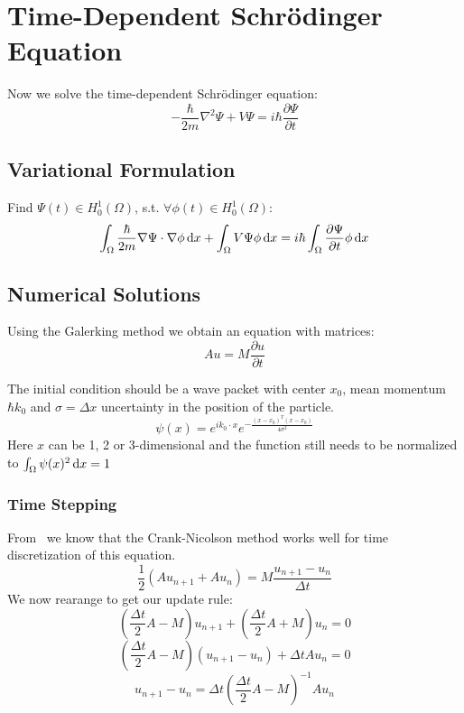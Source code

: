 \documentclass[a4paper,11pt]{scrartcl}
\newcommand*{\dx}{\dif{}x}
\newcommand*{\Dt}{\Delta{}t}
\begin{document}
\section{Time-Dependent Schrödinger Equation}
Now we solve the time-dependent Schrödinger equation:
\[ -\frac{\hbar}{2m} \nabla^2 \Psi + V \Psi = i \hbar \frac{\partial\Psi}{\partial{}t}\]

\subsection{Variational Formulation}

Find $\Psi(t) \in H^1_0(\Omega)$, s.t. $\forall \phi(t) \in H^1_0(\Omega)$:
\[ \int_{\Omega} \frac{\hbar}{2m} \nabla \Psi \cdot \nabla\phi \dx +
  \int_{\Omega} V \Psi \phi\dx = i \hbar\int_{\Omega}
  \frac{\partial\Psi}{\partial{}t} \phi\dx\]

\subsection{Numerical Solutions}
Using the Galerking method we obtain an equation with matrices:
\[A u = M \frac{\partial{}u}{\partial{}t}\]

The initial condition should be a wave packet with center $x_0$, mean momentum
$\hbar k_0$ and $\sigma = \Delta x$ uncertainty in the position of the particle.
\[\psi(x) =  e^{ik_0\cdot x}e^{-\frac{(x-x_0)^T(x-x_0)}{4\sigma^2}}\]
Here $x$ can be 1, 2 or 3-dimensional and the function still needs to be
normalized to $\int_{\Omega}\psi(x)^2\dx = 1$

\subsubsection{Time Stepping}
From~\cite{Sehra07} we know that the Crank-Nicolson method works well for time
discretization of this equation.
\[ \frac{1}{2} (A u_{n+1} + A u_{n}) = M \frac{u_{n+1} - u_n}{\Dt} \]
We now rearange to get our update rule:
\[ \left( \frac{\Dt}{2}A - M \right) u_{n+1} + \left( \frac{\Dt}{2} A + M \right) u_n = 0\]
\[ \left( \frac{\Dt}{2}A - M \right) (u_{n+1} - u_n) + \Dt A u_n = 0\]
\[ u_{n+1} - u_n = \Dt \left( \frac{\Dt}{2}A - M \right)^{-1} A u_n\]

{}

\end{document}

